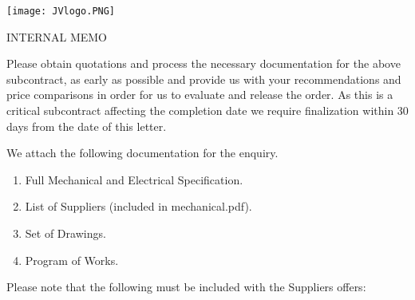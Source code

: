 \documentclass[a4paper,11pt,oneside]{article}
\begin{document}
\sffamily
\mbox{}
\texttt{[image: JVlogo.PNG]}
\vspace{1em}

\begin{center}INTERNAL MEMO\end{center}
\Date 


\TOMCD


\setlength{\parskip}{\baselineskip}


Please obtain quotations and process the necessary documentation for the above subcontract, as early as possible and provide us with your recommendations and price comparisons in order for us to evaluate and release the order. As this is a critical subcontract affecting the completion date we require finalization within 30 days from the date of this letter. 

We attach the following documentation for the enquiry. 

\begin{enumerate}
\item Full Mechanical and Electrical Specification.
\item List of Suppliers (included in mechanical.pdf).
\item Set of Drawings.
\item Program of Works.
\end{enumerate}

Please note that the following must be included with the Suppliers offers:
\end{document}
